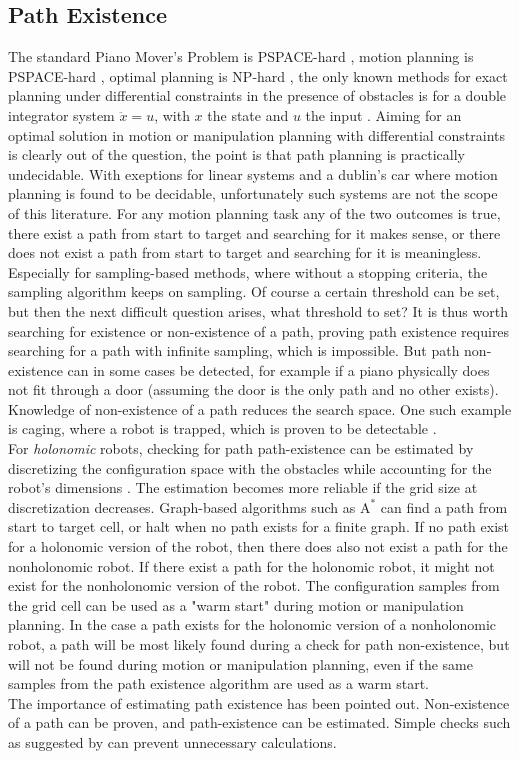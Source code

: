 \subsection{Path Existence}
\label{subsection: path_existence}
The standard Piano Mover’s Problem is PSPACE-hard \cite{reif_complexity_1979}, motion planning is PSPACE-hard \cite{canny_complexity_1988}, optimal planning is NP-hard  \cite{canny_new_1987}, the only known methods for exact planning under differential constraints in the presence of obstacles is for a double integrator system $\ddot{x} = u$, with $x$ the state and $u$ the input \cite{lavalle_planning_2006}.  Aiming for an optimal solution in motion or manipulation planning with differential constraints is clearly out of the question, the point is that path planning is practically undecidable. With exeptions for linear systems and a dublin's car where motion planning is found to be decidable\cite{cheng_decidability_2007}, unfortunately such systems are not the scope of this literature. For any motion planning task any of the two outcomes is true, there exist a path from start to target and searching for it makes sense, or there does not exist a path from start to target and searching for it is meaningless. Especially for sampling-based methods, where without a stopping criteria, the sampling algorithm keeps on sampling. Of course a certain threshold can be set, but then the next difficult question arises, what threshold to set? It is thus worth searching for existence or non-existence of a path, proving path existence requires searching for a path with infinite sampling, which is impossible. But path non-existence can in some cases be detected, for example if a piano physically does not fit through a door (assuming the door is the only path and no other exists). Knowledge of non-existence of a path reduces the search space. One such example is caging, where a robot is trapped, which is proven to be detectable \cite{amato_caging_2020}.\\

For \textit{holonomic} robots, checking for path path-existence can be estimated by discretizing the configuration space with the obstacles while accounting for the robot's dimensions \cite{akella_simple_2008}. The estimation becomes more reliable if the grid size at discretization decreases. Graph-based algorithms such as $\text{A}^*$ can find a path from start to target cell, or halt when no path exists for a finite graph. If no path exist for a holonomic version of the robot, then there does also not exist a path for the nonholonomic robot. If there exist a path for the holonomic robot, it might not exist for the nonholonomic version of the robot. The configuration samples from the grid cell can be used as a "warm start" during motion or manipulation planning. In the case a path exists for the holonomic version of a nonholonomic robot, a path will be most likely found during a check for path non-existence, but will not be found during motion or manipulation planning, even if the same samples from the path existence algorithm are used as a warm start. \\

The importance of estimating path existence has been pointed out. Non-existence of a path can be proven, and path-existence can be estimated. Simple checks such as suggested by \cite{akella_simple_2008} can prevent unnecessary calculations. 

